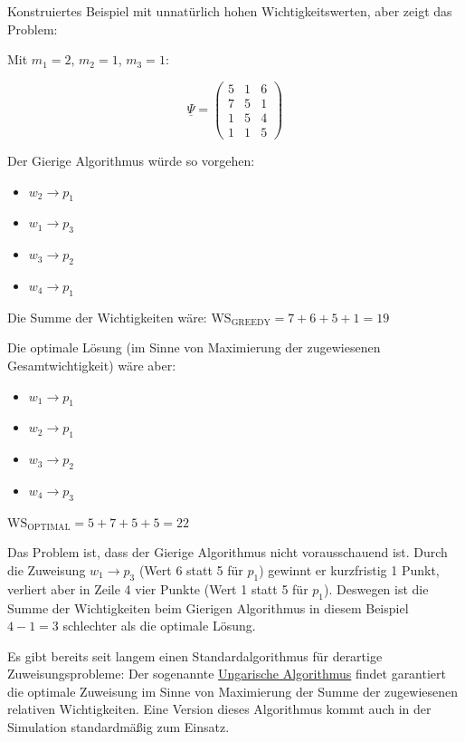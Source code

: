Konstruiertes Beispiel mit unnatürlich hohen Wichtigkeitswerten, aber zeigt das Problem:

Mit $m_1 = 2$, $m_2 = 1$, $m_3 = 1$:

\[
  \underline{\Psi} = \begin{pmatrix}
    5 & 1 & 6 \\
    7 & 5 & 1 \\
    1 & 5 & 4 \\
    1 & 1 & 5
  \end{pmatrix}
\]

Der Gierige Algorithmus würde so vorgehen:
\begin{itemize}[label={}]
  \item $w_2 \longrightarrow p_1$
  \item $w_1 \longrightarrow p_3$
  \item $w_3 \longrightarrow p_2$
  \item $w_4 \longrightarrow p_1$
\end{itemize}

Die Summe der Wichtigkeiten wäre: $\mathrm{WS}_{\mathrm{GREEDY}} = 7 + 6 + 5 + 1 = 19$

Die optimale Lösung (im Sinne von Maximierung der zugewiesenen Gesamtwichtigkeit) wäre aber:
\begin{itemize}[label={}]
  \item $w_1 \longrightarrow p_1$
  \item $w_2 \longrightarrow p_1$
  \item $w_3 \longrightarrow p_2$
  \item $w_4 \longrightarrow p_3$
\end{itemize}

$\mathrm{WS}_{\mathrm{OPTIMAL}} = 5 + 7 + 5 + 5 = 22$

Das Problem ist, dass der Gierige Algorithmus nicht vorausschauend ist. Durch die Zuweisung
$w_1 \to p_3$ (Wert 6 statt 5 für $p_1$) gewinnt er kurzfristig 1 Punkt, verliert aber in Zeile
4 vier Punkte (Wert 1 statt 5 für $p_1$). Deswegen ist die Summe der Wichtigkeiten beim Gierigen
Algorithmus in diesem Beispiel $4 - 1 = 3$ schlechter als die optimale Lösung.

Es gibt bereits seit langem einen Standardalgorithmus für derartige Zuweisungsprobleme: Der
sogenannte \href{https://de.wikipedia.org/wiki/Ungarische\_Methode}{Ungarische Algorithmus}
findet garantiert die optimale Zuweisung im Sinne von Maximierung der Summe der zugewiesenen
relativen Wichtigkeiten. Eine Version dieses Algorithmus kommt auch in der Simulation
standardmäßig zum Einsatz.

